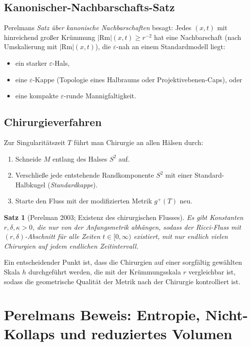 \documentclass[12pt,a4paper]{amsart}
\newtheorem{theorem}{Satz}[section]
\theoremstyle{definition}
\theoremstyle{remark}
\newcommand{\Rm}{\mathrm{Rm}}
\begin{document}
\subsection{Kanonischer-Nachbarschafts-Satz}

Perelmans \emph{Satz über kanonische Nachbarschaften} besagt: Jedes $(x,t)$
mit hinreichend großer Krümmung $|\Rm|(x,t) \geq r^{-2}$ hat eine
Nachbarschaft (nach Umskalierung mit $|\Rm|(x,t)$), die $\varepsilon$-nah an
einem Standardmodell liegt:
\begin{itemize}
  \item ein starker $\varepsilon$-Hals,
  \item eine $\varepsilon$-Kappe (Topologie eines Halbraums oder
    Projektiv\-ebenen-Caps), oder
  \item eine kompakte $\varepsilon$-runde Mannigfaltigkeit.
\end{itemize}

\subsection{Chirurgieverfahren}

Zur Singularitätszeit $T$ führt man Chirurgie an allen Hälsen durch:
\begin{enumerate}
  \item Schneide $M$ entlang des Halses $S^2$ auf.
  \item Verschließe jede entstehende Randkomponente $S^2$ mit einer
    Standard-Halbkugel (\emph{Standardkappe}).
  \item Starte den Fluss mit der modifizierten Metrik $g^+(T)$ neu.
\end{enumerate}

\begin{theorem}[Perelman 2003; Existenz des chirurgischen Flusses]
\label{thm:chirurgie}
Es gibt Konstanten $r, \delta, \kappa > 0$, die nur von der Anfangsmetrik
abhängen, sodass der Ricci-Fluss mit $(r,\delta)$-Abschnitt für alle Zeiten
$t \in [0,\infty)$ existiert, mit nur endlich vielen Chirurgien auf jedem
endlichen Zeitintervall.
\end{theorem}

Ein entscheidender Punkt ist, dass die Chirurgien auf einer sorgfältig
gewählten Skala $h$ durchgeführt werden, die mit der Krümmungsskala $r$
vergleichbar ist, sodass die geometrische Qualität der Metrik nach der
Chirurgie kontrolliert ist.


\section{Perelmans Beweis: Entropie, Nicht-Kollaps und reduziertes Volumen}
\label{sec:perelman}
\end{document}
